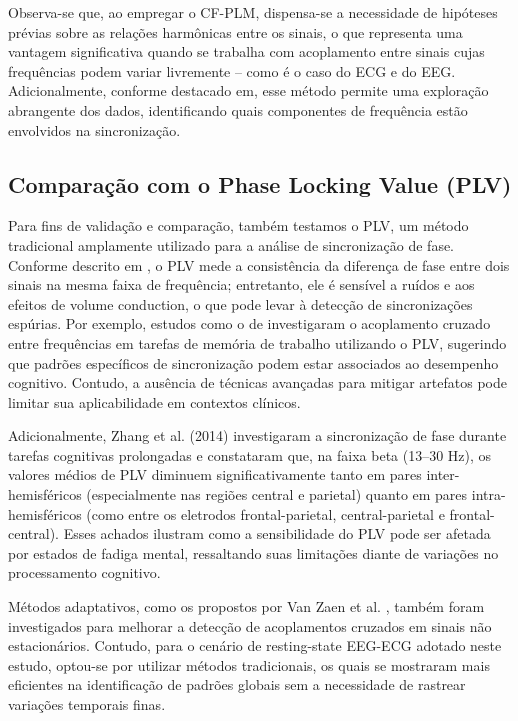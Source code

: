 Observa-se que, ao empregar o CF-PLM, dispensa-se a necessidade de hipóteses prévias sobre as relações harmônicas entre os sinais, o que representa uma vantagem significativa quando se trabalha com acoplamento entre sinais cujas frequências podem variar livremente – como é o caso do ECG e do EEG. Adicionalmente, conforme destacado em\textsuperscript{\cite{sorrentino2022detection}}, esse método permite uma exploração abrangente dos dados, identificando quais componentes de frequência estão envolvidos na sincronização.

\subsection{Comparação com o Phase Locking Value (PLV)}

Para fins de validação e comparação, também testamos o PLV, um método tradicional amplamente utilizado para a análise de sincronização de fase. Conforme descrito em \cite{seraj2018cerebral}, o PLV mede a consistência da diferença de fase entre dois sinais na mesma faixa de frequência; entretanto, ele é sensível a ruídos e aos efeitos de volume conduction, o que pode levar à detecção de sincronizações espúrias. Por exemplo, estudos como o de \cite{abubaker2021working} investigaram o acoplamento cruzado entre frequências em tarefas de memória de trabalho utilizando o PLV, sugerindo que padrões específicos de sincronização podem estar associados ao desempenho cognitivo. Contudo, a ausência de técnicas avançadas para mitigar artefatos pode limitar sua aplicabilidade em contextos clínicos.

Adicionalmente, Zhang et al. (2014) \cite{zhang2014phase} investigaram a sincronização de fase durante tarefas cognitivas prolongadas e constataram que, na faixa beta (13--30 Hz), os valores médios de PLV diminuem significativamente tanto em pares inter-hemisféricos (especialmente nas regiões central e parietal) quanto em pares intra-hemisféricos (como entre os eletrodos frontal-parietal, central-parietal e frontal-central). Esses achados ilustram como a sensibilidade do PLV pode ser afetada por estados de fadiga mental, ressaltando suas limitações diante de variações no processamento cognitivo.

Métodos adaptativos, como os propostos por Van Zaen et al. \cite{vanzaen2013adaptive}, também foram investigados para melhorar a detecção de acoplamentos cruzados em sinais não estacionários. Contudo, para o cenário de resting-state EEG-ECG adotado neste estudo, optou-se por utilizar métodos tradicionais, os quais se mostraram mais eficientes na identificação de padrões globais sem a necessidade de rastrear variações temporais finas.

